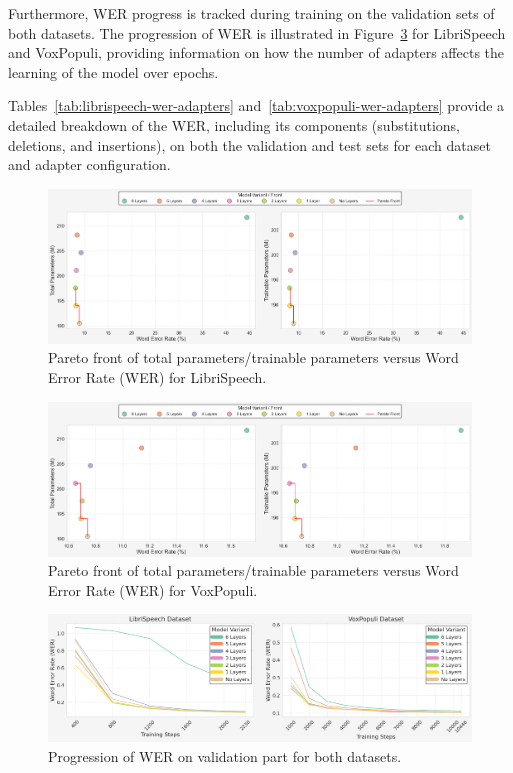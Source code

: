Furthermore, WER progress is tracked during training on the validation sets of both datasets. The progression of WER is illustrated in Figure~\ref{fig:wer-progress-main} for LibriSpeech and VoxPopuli, providing information on how the number of adapters affects the learning of the model over epochs.

Tables~\ref{tab:librispeech-wer-adapters} and~\ref{tab:voxpopuli-wer-adapters} provide a detailed breakdown of the WER, including its components (substitutions, deletions, and insertions), on both the validation and test sets for each dataset and adapter configuration.

\begin{figure}[h!]
    \centering
    \includegraphics[width=1\textwidth]{obrazky-figures/plots/libri.png}
    \caption{Pareto front of total parameters/trainable parameters versus Word Error Rate (WER) for LibriSpeech.}
    \label{fig:pareto-front-librispeech}
\end{figure}

\begin{figure}[h!]
    \centering
    \includegraphics[width=1\textwidth]{obrazky-figures/plots/vox.png}
    \caption{Pareto front of total parameters/trainable parameters versus Word Error Rate (WER) for VoxPopuli.}
    \label{fig:pareto-front-voxpopuli}
\end{figure}


\begin{figure}[h]
    \centering
    \includegraphics[width=1\textwidth]{obrazky-figures/plots/wer.png}
    \caption{Progression of WER on validation part for both datasets.}
    \label{fig:wer-progress-main}
\end{figure}


